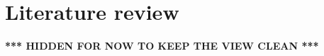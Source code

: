 \documentclass{article}
\begin{document}
    
    
    
    
    
    
    
    

\newpage

\section{Literature review \label{literature}}
\textbf{*** HIDDEN FOR NOW TO KEEP THE VIEW CLEAN ***}
\end{document}
